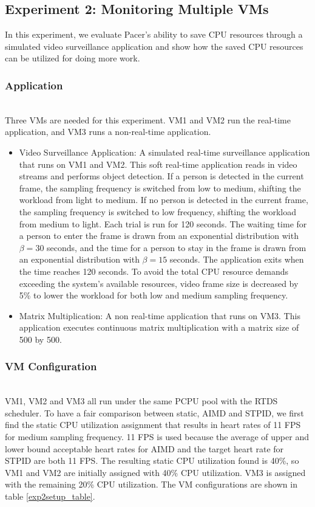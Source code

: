 \subsection{Experiment 2: Monitoring Multiple VMs}

In this experiment, we evaluate Pacer's ability to save CPU resources through a simulated video surveillance application and show how the saved CPU resources can be utilized for doing more work.



\subsubsection*{Application}\hfill\\
\indent Three VMs are needed for this experiment. VM1 and VM2 run the real-time application, and VM3 runs a non-real-time application. 
\begin{itemize}
\item Video Surveillance Application: A simulated real-time surveillance application that runs on VM1 and VM2. This soft real-time application reads in video streams and performs object detection. If a person is detected in the current frame, the sampling frequency is switched from low to medium, shifting the workload from light to medium. If no person is detected in the current frame, the sampling frequency is switched to low frequency, shifting the workload from medium to light. Each trial is run for 120 seconds. The waiting time for a person to enter the frame is drawn from an exponential distribution with $\beta=30$ seconds, and the time for a person to stay in the frame is drawn from an exponential distribution with $\beta=15$ seconds. The application exits when the time reaches 120 seconds. To avoid the total CPU resource demands exceeding the system's available resources, video frame size is decreased by 5\% to lower the workload for both low and medium sampling frequency.
\item Matrix Multiplication: A non real-time application that runs on VM3. This application executes continuous matrix multiplication with a matrix size of 500 by 500.
\end{itemize}


\subsubsection*{VM Configuration}\hfill\\
\indent VM1, VM2 and VM3 all run under the same PCPU pool with the RTDS scheduler. To have a fair comparison between static, AIMD and STPID, we first find the static CPU utilization assignment that results in heart rates of 11 FPS for medium sampling frequency. 11 FPS is used because the average of upper and lower bound acceptable heart rates for AIMD and the target heart rate for STPID are both 11 FPS. The resulting static CPU utilization found is 40\%, so VM1 and VM2 are initially assigned with 40\% CPU utilization. VM3 is assigned with the remaining 20\% CPU utilization. The VM configurations are shown in table \ref{exp2setup_table}.

